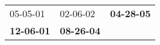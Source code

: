 \begin{supertabular}{p{0.33\columnwidth}p{0.33\columnwidth}p{0.33\columnwidth}}
          05-05-01\textsuperscript{} &           02-06-02\textsuperscript{} &  \textbf{04-28-05\textsuperscript{}} \\
 \textbf{12-06-01\textsuperscript{}} &  \textbf{08-26-04\textsuperscript{}} &                                      \\
\end{supertabular}
